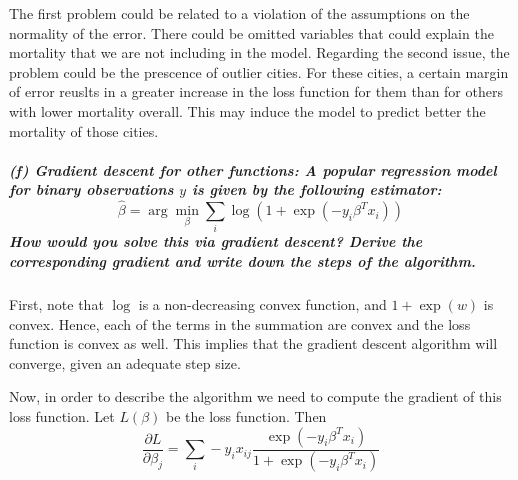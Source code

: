 \documentclass[11pt, english]{article}
\begin{document}
The first problem could be related to a violation of the assumptions on
the normality of the error. There could be omitted variables that could
explain the mortality that we are not including in the model. Regarding
the second issue, the problem could be the prescence of outlier cities.
For these cities, a certain margin of error reuslts in a greater
increase in the loss function for them than for others with lower
mortality overall. This may induce the model to predict better the
mortality of those cities.
    
    \hypertarget{f-gradient-descent-for-other-functions-a-popular-regression-model-for-binary-observations-y-is-given-by-the-following-estimator-hatbeta-argmin_beta-sum_i-logleft1-expleft-y_i-betat-x_i-rightright-how-would-you-solve-this-via-gradient-descent-derive-the-corresponding-gradient-and-write-down-the-steps-of-the-algorithm.}{%
\subparagraph{\texorpdfstring{(f) \emph{Gradient descent for other
functions:} A popular regression model for binary observations \(y\) is
given by the following estimator:
\[ \hat{\beta} = \arg\min_{\beta} \sum_{i} \log\left(1 + \exp\left(-y_i \beta^T x_i \right)\right)\]
How would you solve this via gradient descent? Derive the corresponding
gradient and write down the steps of the
algorithm.\\[2ex]}{(f) Gradient descent for other functions: A popular regression model for binary observations y is given by the following estimator:  \textbackslash hat\{\textbackslash beta\} = \textbackslash arg\textbackslash min\_\{\textbackslash beta\} \textbackslash sum\_\{i\} \textbackslash log\textbackslash left(1 + \textbackslash exp\textbackslash left(-y\_i \textbackslash beta\^{}T x\_i~\textbackslash right)\textbackslash right) How would you solve this via gradient descent? Derive the corresponding gradient and write down the steps of the algorithm.}}\label{f-gradient-descent-for-other-functions-a-popular-regression-model-for-binary-observations-y-is-given-by-the-following-estimator-hatbeta-argmin_beta-sum_i-logleft1-expleft-y_i-betat-x_i-rightright-how-would-you-solve-this-via-gradient-descent-derive-the-corresponding-gradient-and-write-down-the-steps-of-the-algorithm.}}

    First, note that \(\log\) is a non-decreasing convex function, and
\(1 + \exp(w)\) is convex. Hence, each of the terms in the summation are
convex and the loss function is convex as well. This implies that the
gradient descent algorithm will converge, given an adequate step size.

Now, in order to describe the algorithm we need to compute the gradient
of this loss function. Let \(L(\beta)\) be the loss function. Then
\[\frac{\partial L}{\partial \beta_j} = \sum_i -y_i x_{ij}\frac{\exp\left(-y_i \beta^T x_i\right)}{1 + \exp\left(-y_i \beta^T x_i\right)}\]
\end{document}
